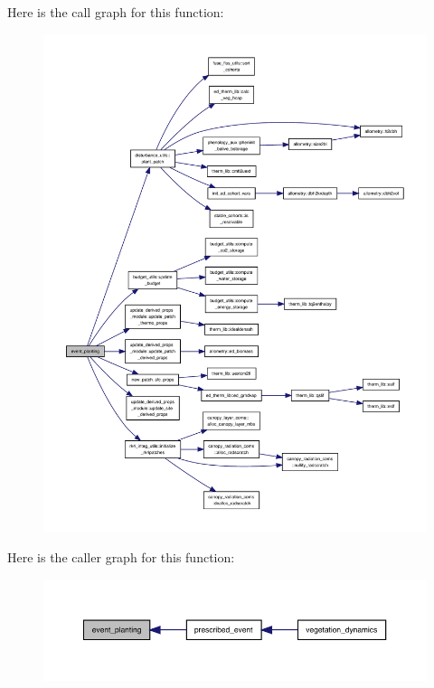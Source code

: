 Here is the call graph for this function\+:
\nopagebreak
\begin{figure}[H]
\begin{center}
\leavevmode
\includegraphics[width=350pt]{events_8f90_a3fcb64b4de4ae9408c3e365f6cbd1be6_cgraph}
\end{center}
\end{figure}
Here is the caller graph for this function\+:
\nopagebreak
\begin{figure}[H]
\begin{center}
\leavevmode
\includegraphics[width=350pt]{events_8f90_a3fcb64b4de4ae9408c3e365f6cbd1be6_icgraph}
\end{center}
\end{figure}
\mbox{\label{events_8f90_a344468d6236c4635f3bd01bc47acde4a}} 
